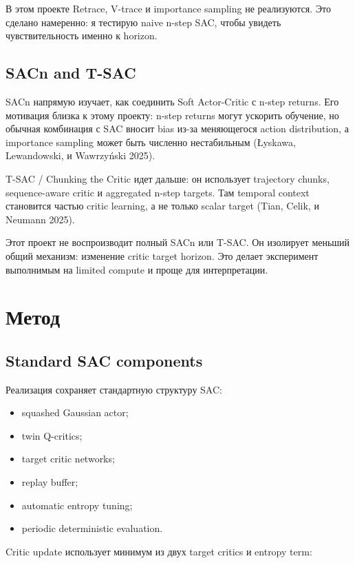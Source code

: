 \documentclass[
  russian,
]{article}
\providecommand{\tightlist}{%
  \setlength{\itemsep}{0pt}\setlength{\parskip}{0pt}}
\begin{document}
В этом проекте Retrace, V-trace и importance sampling не реализуются.
Это сделано намеренно: я тестирую naive n-step SAC, чтобы увидеть
чувствительность именно к horizon.

\subsection{SACn and T-SAC}\label{sacn-and-t-sac}

SACn напрямую изучает, как соединить Soft Actor-Critic с n-step returns.
Его мотивация близка к этому проекту: n-step returns могут ускорить
обучение, но обычная комбинация с SAC вносит bias из-за меняющегося
action distribution, а importance sampling может быть численно
нестабильным (Łyskawa, Lewandowski, и Wawrzyński 2025).

T-SAC / Chunking the Critic идет дальше: он использует trajectory
chunks, sequence-aware critic и aggregated n-step targets. Там temporal
context становится частью critic learning, а не только scalar target
(Tian, Celik, и Neumann 2025).

Этот проект не воспроизводит полный SACn или T-SAC. Он изолирует меньший
общий механизм: изменение critic target horizon. Это делает эксперимент
выполнимым на limited compute и проще для интерпретации.

\section{Метод}\label{ux43cux435ux442ux43eux434}

\subsection{Standard SAC components}\label{standard-sac-components}

Реализация сохраняет стандартную структуру SAC:

\begin{itemize}
\tightlist
\item
  squashed Gaussian actor;
\item
  twin Q-critics;
\item
  target critic networks;
\item
  replay buffer;
\item
  automatic entropy tuning;
\item
  periodic deterministic evaluation.
\end{itemize}

Critic update использует минимум из двух target critics и entropy term:
\end{document}
